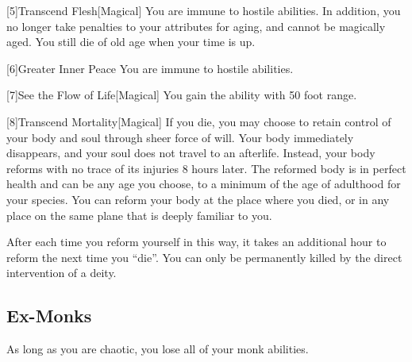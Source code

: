         [5]{Transcend Flesh}[Magical]
        You are immune to hostile  abilities.
        In addition, you no longer take penalties to your attributes for aging, and cannot be magically aged.
        You still die of old age when your time is up.

        [6]{Greater Inner Peace}
        You are immune to hostile  abilities.

        [7]{See the Flow of Life}[Magical]
        You gain the  ability with 50 foot range.

        [8]{Transcend Mortality}[Magical]
        If you die, you may choose to retain control of your body and soul through sheer force of will.
        Your body immediately disappears, and your soul does not travel to an afterlife.
        Instead, your body reforms with no trace of its injuries 8 hours later.
        The reformed body is in perfect health and can be any age you choose, to a minimum of the age of adulthood for your species.
        You can reform your body at the place where you died, or in any place on the same plane that is deeply familiar to you.

        After each time you reform yourself in this way, it takes an additional hour to reform the next time you ``die''.
        You can only be permanently killed by the direct intervention of a deity.

    \subsection{Ex-Monks}
        As long as you are chaotic, you lose all of your  monk abilities.

\newpage
